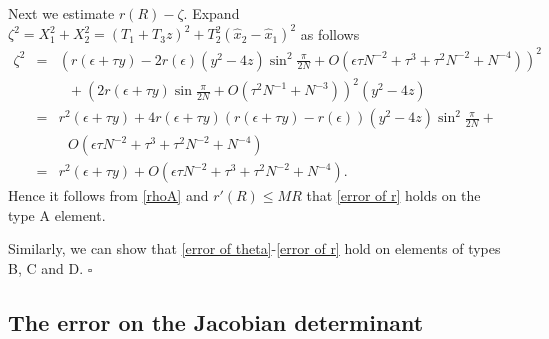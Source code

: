 \documentclass[12pt]{article}
\numberwithin{equation}{section}
\begin{document}
Next we estimate $r(R) - \zeta$. Expand
$\zeta^2=X_1^2+X_2^2=(T_1+T_3z)^2+T_2^2(\hat{x}_2-\hat{x}_1)^2$ as follows
\begin{eqnarray*}
\zeta^2&=&(r(\epsilon+\tau y)-2r(\epsilon)(y^2-4z)\sin^2{\frac{\pi}{2N}}+
O(\epsilon \tau N^{-2}+\tau^3+\tau^2N^{-2}+N^{-4}))^2\\
& &\ \ \ + (2r(\epsilon+\tau y)\sin{\frac{\pi}{2N}}+O(\tau^2N^{-1}+N^{-3}))^2(y^2-4z)\\
&=&r^2(\epsilon+\tau y)+4r(\epsilon+\tau y)(r(\epsilon+\tau y)-r(\epsilon))
(y^2-4z)\sin^2{\frac{\pi}{2N}}+\\
& & \ \ \ O(\epsilon \tau N^{-2}+\tau^3+\tau^2N^{-2}+N^{-4})\\
&=&r^2(\epsilon+\tau y)+O(\epsilon \tau N^{-2}+\tau^3+\tau^2N^{-2}+N^{-4}).
\end{eqnarray*}
Hence it follows from \eqref{rhoA} and $r'(R)\le MR$ that \eqref{error of r} holds on
the type A element.

Similarly, we can show that \eqref{error of theta}-\eqref{error of r} hold on elements
of types B, C and D. \hfill $\square$
\vspace{3mm}

\subsection{The error on the Jacobian determinant}
\end{document}
